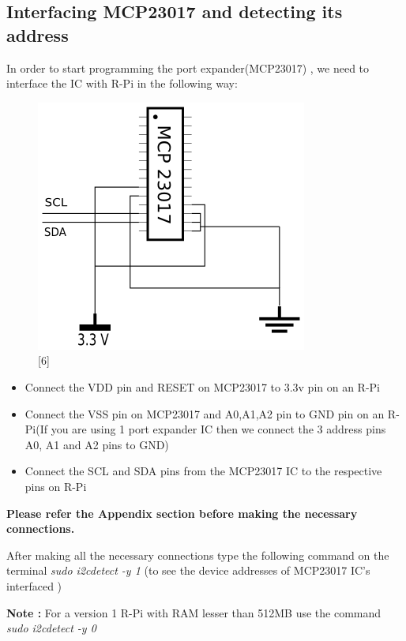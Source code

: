 \documentclass[11pt,a4paper]{article}
\begin{document}
	\subsection{Interfacing MCP23017 and detecting its address}
		In order to start programming the port expander(MCP23017) , we need to interface the IC with R-Pi in the following way:
	\begin{figure}[h!]
		\includegraphics[scale=0.8]{interface.png}
		\centering
		\caption{[6]}
	\end{figure} 
\flushleft
			
	\begin{itemize}
			\item Connect the VDD pin and RESET on MCP23017 to 3.3v pin on an R-Pi 
			\item Connect the VSS pin on MCP23017 and A0,A1,A2 pin to GND pin on an R-Pi(If you are using 1 port expander IC then we connect the 3 address pins A0, A1 and A2 pins to GND)
			\item Connect the SCL and SDA pins from the MCP23017 IC to the respective pins on R-Pi
	\end{itemize}
				
	\vspace{0.3cm}
	\textbf{Please refer the Appendix section before making the necessary connections. }
				
	\vspace{0.3cm}
	After making all the necessary connections type the following command on the terminal \textit{sudo i2cdetect -y 1} (to see the device addresses of MCP23017 IC's interfaced )
				
	\vspace{0.3cm}
	\textbf{Note :} For a version 1 R-Pi with RAM lesser than 512MB use the command \textit{sudo i2cdetect -y 0} 
	
\end{document}

